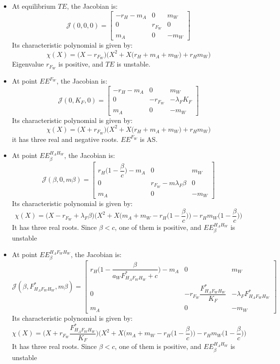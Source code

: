 \documentclass{article}
\newcommand{\lfw}{\lambda_{F}}
\begin{document}
\begin{itemize}
\item At equilibrium $TE$, the Jacobian is:
$$
\mathcal{J}(0,0,0) = \begin{bmatrix}
-r_H - m_A & 0 & m_W \\
0 & r_{F_W}  & 0 \\
m_A & 0 & -m_W
\end{bmatrix}
$$ 
Its characteristic polynomial is given by:
$$
\chi(X) = \Big(X - r_{F_W}\Big) \Big(X^2 + X \big(r_H + m_A + m_W \big) + r_H m_W \Big)
$$
Eigenvalue $r_{F_W}$ is positive, and $TE$ is unstable.
\item At point $EE^{F_W}$, the Jacobian is:
$$
\mathcal{J}(0,K_F,0) = \begin{bmatrix}
-r_H - m_A & 0 & m_W \\
0 & -r_{F_W}  & -\lfw K_F \\
m_A & 0 & -m_W
\end{bmatrix}
$$
Its characteristic polynomial is given by:
$$
\chi(X) = \Big(X + r_{F_W}\Big) \Big(X^2 + X \big(r_H + m_A + m_W \big) + r_Hm_W \Big)
$$
it has three real and negative roots. $EE^{F_W}$ is AS.

\item At point $EE^{H_AH_W}_\beta$, the Jacobian is:
$$
\mathcal{J}(\beta, 0, m\beta) = \begin{bmatrix}
r_H \Big(1-\dfrac{\beta}{c}\Big) - m_A & 0 & m_W \\
0 & r_{F_W} - m \lfw \beta  & 0 \\
m_A & 0 & -m_W
\end{bmatrix}
$$
Its characteristic polynomial is given by:
$$
\chi(X) = \Big(X - r_{F_W} + \lfw \beta\Big) \Big(X^2 + X \Big(m_A + m_W - r_H\Big(1-\dfrac{\beta}{c}\Big) \Big) -r_H m_W\Big(1-\dfrac{\beta}{c}\Big) \Big)
$$
It has three real roots. Since $\beta < c$, one of them is positive, and $EE^{H_AH_W}_\beta$ is unstable


\item At point $EE^{H_AF_WH_W}_\beta$, the Jacobian is:
$$
\mathcal{J}(\beta, F^*_{H_AF_WH_W}, m\beta) = \begin{bmatrix}
r_H \Big(1-\dfrac{\beta}{a_W F^*_{H_AF_WH_W}+ c}\Big) - m_A & 0 & m_W \\
0 & -r_{F_W}\dfrac{F^*_{H_AF_WH_W}}{K_F}  & -\lfw F^*_{H_AF_WH_W} \\
m_A & 0 & -m_W
\end{bmatrix}
$$
Its characteristic polynomial is given by:
$$
\chi(X) = \Big(X +r_{F_W}\dfrac{F^*_{H_AF_WH_W}}{K_F} \Big) \Big(X^2 + X \Big(m_A + m_W - r_H\Big(1-\dfrac{\beta}{c}\Big) \Big) -r_H m_W\Big(1-\dfrac{\beta}{c}\Big) \Big)
$$
It has three real roots. Since $\beta < c$, one of them is positive, and $EE^{H_AH_W}_\beta$ is unstable


\end{itemize}
\end{document}
